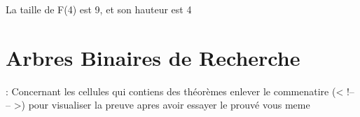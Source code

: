\documentclass[letterpaper,10pt,english]{jupyterBook}
\begin{document}
\begin{sphinxVerbatimInput}

\begin{sphinxVerbatim}[commandchars=\\\{\}]
\end{sphinxVerbatim}
\end{sphinxVerbatimInput}
\begin{sphinxVerbatimOutput}

\begin{sphinxVerbatim}[commandchars=\\\{\}]
[3, 2, 1, 1, 1, 1, 0, 1, 0]
\end{sphinxVerbatim}
\end{sphinxVerbatimOutput}
\begin{sphinxVerbatimInput}

\begin{sphinxVerbatim}[commandchars=\\\{\}]
\end{sphinxVerbatim}
\end{sphinxVerbatimInput}
\begin{sphinxVerbatimOutput}

\begin{sphinxVerbatim}[commandchars=\\\{\}]
La taille de F(4) est 9, et son hauteur est 4
\end{sphinxVerbatim}
\end{sphinxVerbatimOutput}


\chapter{Arbres Binaires de Recherche}
\label{\detokenize{notebooks/ABR/ABR:arbres-binaires-de-recherche}}\label{\detokenize{notebooks/ABR/ABR::doc}}


\sphinxAtStartPar
{}:  Concernant les cellules qui contiens des théorèmes enlever le commenatire (< !– – >) pour visualiser la preuve apres avoir essayer le prouvé vous meme  
\begin{sphinxVerbatimInput}

\begin{sphinxVerbatim}[commandchars=\\\{\}]
   
 
\end{sphinxVerbatim}
\end{sphinxVerbatimInput}
\end{document}
